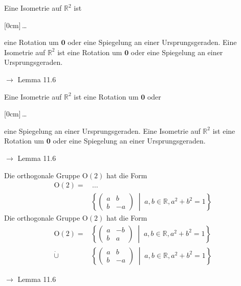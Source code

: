 \documentclass[11pt]{article}
\renewcommand{\cite}[1]{\par\bigskip\hfill{\color{gray}\tiny\(\to\) #1}}
\newcommand{\RR}{\mathbb{R}}
\renewcommand{\vec}[1]{\mathbf{#1}}
\newcommand{\hide}[1]{\parbox{0cm}{\raisebox{-7pt}[0cm]{\dots}}\color{white}#1\color{black}}
\let\olddots\dots
\renewcommand{\dots}{\,\olddots\,}
\newenvironment{field}{}{\newpage}
\newif\ifnote
\newenvironment{note}{\notetrue}{\notefalse}
\newcommand{\uuid}{}
\newcommand{\xplain}[1]{\renewcommand{\uuid}{#1}}
\begin{document}
\begin{note}
    \xplain{ac148780-c30d-11ec-9d64-0242ac120002}
    \begin{field}
        Eine Isometrie auf \(\RR^2\) ist \hide{eine Rotation um \(\vec{0}\)} oder eine Spiegelung an einer Ursprungsgeraden.
    \end{field}
    \begin{field}
        Eine Isometrie auf \(\RR^2\) ist eine Rotation um \(\vec{0}\) oder eine Spiegelung an einer Ursprungsgeraden.
        \cite{Lemma 11.6}
    \end{field}

    \begin{field}
        Eine Isometrie auf \(\RR^2\) ist eine Rotation um \(\vec{0}\) oder \hide{eine Spiegelung an einer Ursprungsgeraden}.
    \end{field}
    \begin{field}
        Eine Isometrie auf \(\RR^2\) ist eine Rotation um \(\vec{0}\) oder eine Spiegelung an einer Ursprungsgeraden.
        \cite{Lemma 11.6}
    \end{field}

    \begin{field}
        Die orthogonale Gruppe \(\text{O}(2)\) hat die Form
        \begin{align*}
            \text{O}(2) = &\dots\\
            \phantom{\dot\cup} &\left\{\left(\begin{smallmatrix}
                              a & b\\ b & -a
                          \end{smallmatrix}\right) \;\middle\vert\; a,b\in \RR, a^2+b^2=1\right\}
        \end{align*}
    \end{field}
    \begin{field}
        Die orthogonale Gruppe \(\text{O}(2)\) hat die Form
        \begin{align*}
            \text{O}(2) = &\left\{\left(\begin{smallmatrix}
                                  a & -b\\ b & a
                                \end{smallmatrix}\right) \;\middle\vert\; a,b\in \RR, a^2+b^2=1\right\}\\
            \dot\cup &\left\{\left(\begin{smallmatrix}
                              a & b\\ b & -a
                            \end{smallmatrix}\right) \;\middle\vert\; a,b\in \RR, a^2+b^2=1\right\}
        \end{align*}
        \cite{Lemma 11.6}
    \end{field}


\end{note}
\end{document}
